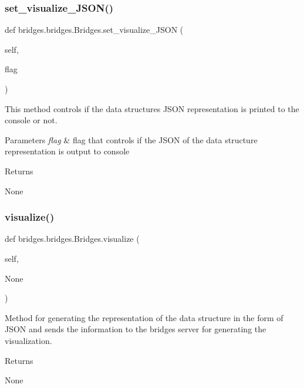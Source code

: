 \subsubsection{\texorpdfstring{set\+\_\+visualize\+\_\+\+J\+S\+O\+N()}{set\_visualize\_JSON()}}
{\footnotesize\ttfamily def bridges.\+bridges.\+Bridges.\+set\+\_\+visualize\+\_\+\+J\+S\+ON (\begin{DoxyParamCaption}\item[{}]{self,  }\item[{}]{flag }\end{DoxyParamCaption})}



This method controls if the data structure\textquotesingle{}s J\+S\+ON representation is printed to the console or not. 


\begin{DoxyParams}{Parameters}
{\em flag} & flag that controls if the J\+S\+ON of the data structure representation is output to console \\
\hline
\end{DoxyParams}
\begin{DoxyReturn}{Returns}


None 
\end{DoxyReturn}
\mbox{\label{classbridges_1_1bridges_1_1_bridges_a3c1321f8be7b249639a47eba10b67c70}} 
\subsubsection{\texorpdfstring{visualize()}{visualize()}}
{\footnotesize\ttfamily def bridges.\+bridges.\+Bridges.\+visualize (\begin{DoxyParamCaption}\item[{}]{self,  }\item[{}]{None }\end{DoxyParamCaption})}



Method for generating the representation of the data structure in the form of J\+S\+ON and sends the information to the bridges server for generating the visualization. 

\begin{DoxyReturn}{Returns}


None 
\end{DoxyReturn}
\mbox{\label{classbridges_1_1bridges_1_1_bridges_a1340374df9e4aa1490d9cd9be2b0e918}} 
